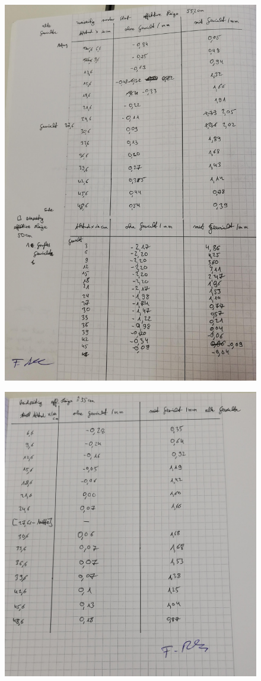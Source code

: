 \begin{figure}[H]
  \centering
  \includegraphics[width=15cm]{content/A2.jpg}
\end{figure}


\begin{figure}[H]
  \centering
  \includegraphics[width=15cm]{content/A3.jpg}
\end{figure}
